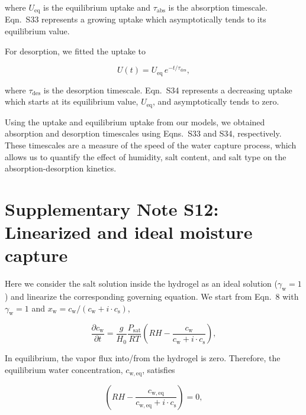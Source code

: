 \documentclass[11pt]{article}
\begin{document}
where $U_\mathrm{eq}$ is the equilibrium uptake and $\tau_\mathrm{abs}$ is the absorption timescale. Eqn.~S33 represents a growing uptake which asymptotically tends to its equilibrium value.

For desorption, we fitted the uptake to

\begin{equation}
U(t) = U_\mathrm{eq}\, e^{-t/\tau_\mathrm{des}}, \tag{S34}
\end{equation}

where $\tau_\mathrm{des}$ is the desorption timescale. Eqn.~S34 represents a decreasing uptake which starts at its equilibrium value, $U_\mathrm{eq}$, and asymptotically tends to zero.

Using the uptake and equilibrium uptake from our models, we obtained absorption and desorption timescales using Eqns.~S33 and S34, respectively. These timescales are a measure of the speed of the water capture process, which allows us to quantify the effect of humidity, salt content, and salt type on the absorption-desorption kinetics.

\clearpage

\section*{Supplementary Note S12: Linearized and ideal moisture capture}

Here we consider the salt solution inside the hydrogel as an ideal solution ($\gamma_\mathrm{w}=1$) and linearize the corresponding governing equation. We start from Eqn.~8 with $\gamma_\mathrm{w}=1$ and $x_\mathrm{w} = c_\mathrm{w}/(c_\mathrm{w}+i\cdot c_\mathrm{s})$,

\begin{equation}
\frac{\partial c_\mathrm{w}}{\partial t} = \frac{g}{H_0}\frac{P_\mathrm{sat}}{RT}\left(RH - \frac{c_\mathrm{w}}{c_\mathrm{w}+i\cdot c_\mathrm{s}}\right), \tag{S35}
\end{equation}

In equilibrium, the vapor flux into/from the hydrogel is zero. Therefore, the equilibrium water concentration, $c_\mathrm{w,eq}$, satisfies

\begin{equation}
\left(RH - \frac{c_\mathrm{w,eq}}{c_\mathrm{w,eq}+i\cdot c_\mathrm{s}}\right) = 0, \tag{S36}
\end{equation}
\end{document}
